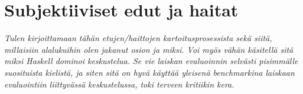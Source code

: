 

\section{Subjektiiviset edut ja haitat} \label{subjektiiviset-edut}

\textit{Tulen kirjoittamaan tähän etujen/haittojen kartoitusprosessista sekä siitä, millaisiin alalukuihin olen jakanut osion ja miksi. Voi myös vähän käsitellä sitä miksi Haskell dominoi keskustelua. Se vie laiskan evaluoinnin selvästi pisimmälle suosituista kielistä, ja siten sitä on hyvä käyttää yleisenä benchmarkina laiskaan evaluointiin liittyvässä keskustelussa, toki terveen kritiikin kera. }

